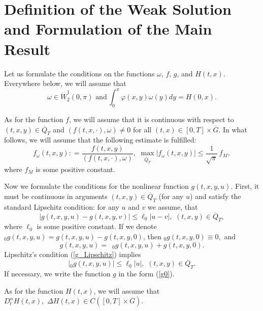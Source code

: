 \documentclass[12pt]{amsart}
\theoremstyle{definition}
\numberwithin{equation}{section}
\begin{document}
\section{Definition of the Weak Solution and Formulation of the Main Result}

Let us formulate the conditions on the functions $\omega$, $f$, $g$, and $H(t, x)$. Everywhere below, we will assume that
\begin{equation}\label{omega}
    \omega \in \dot{W}^1_2(0, \pi) \,\,\text{and} \,\int_0^\pi \varphi(x,y) \omega(y) dy= H(0, x).
\end{equation}

As for the function $f$, we will assume that it is continuous with respect to $(t, x, y) \in \overline{Q}_T$ and \( (f(t, x, \cdot), \omega) \neq 0 \) for all \( (t, x) \in [0, T] \times \overline{G} \). In what follows, we will assume that the following estimate is fulfilled: 
\begin{equation}\label{fomega}
f_\omega (t, x, y): =  \frac{f(t, x, y)}{(f(t, x, \cdot), \omega)}, \,\, \max_{ \overline{Q}_T}|f_\omega (t, x, y)|\leq \frac{1}{\sqrt{\pi}}\, f_M, 
\end{equation}
where $f_M$ is some positive constant.  

Now we formulate the conditions for the nonlinear function $g (t, x, y, u)$. First, it must be continuous in arguments $(t,x,y)\in \overline{Q}_T$ (for any $u$) and satisfy the standard Lipschitz condition:  for any $u$ and $v$ we assume, that
\begin{equation}\label{g_Lipschitz}
    |g(t,x, y, u)- g(t,x, y,  v)|\leq \ell_0  |u-v|,\,\, (t,x,y)\in \overline{Q}_T,
    \end{equation}
where $\ell_0$ is some positive constant. If we denote $_0 g (t, x, y, u)= g(t,x, y, u)- g(t, x, y, 0)$, then $_0 g(t,x, y, 0) \equiv 0,$ and 
\begin{equation}\label{g0}
g (t, x, y, u) =\,\,\, _0 g(t,x, y, u)+ g(t, x, y, 0).   \end{equation}
Lipschitz’s condition (\ref{g_Lipschitz}) implies
\begin{equation}\label{g0_L}
    |_0 g (t,x, y, u)|\leq \ell_0  |u|,\,\,  (t,x,y)\in \overline{Q}_T.
    \end{equation}
If necessary, we write the function $g$ in the form (\ref{g0}).

As for the function $H(t, x)$, we will assume that \( D_t^\alpha H(t, x), \, \, \Delta H(t,x) \in C([0, T] \times \overline{G}) \).
\end{document}
